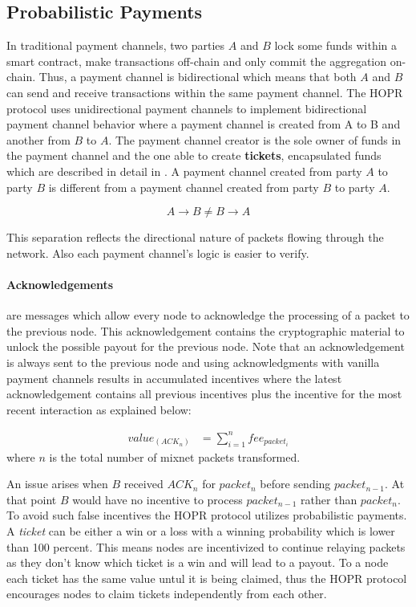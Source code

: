 \subsection{Probabilistic Payments}
\label{sec:probabilisticpayments}

In traditional payment channels, two parties $A$ and $B$ lock some funds within a
smart contract, make transactions off-chain and only commit the aggregation
on-chain. Thus, a payment channel is bidirectional which means that both $A$ and $B$ can
send and receive transactions within the same payment channel. The HOPR protocol uses
unidirectional payment channels to implement bidirectional payment channel behavior where a
payment channel is created from A to B and another from $B$ to $A$. The payment channel creator is
the sole owner of funds in the payment channel and the one able to create
\textbf{tickets}, encapsulated funds which are described in detail in
. A payment channel created from party $A$ to party $B$ is
different from a payment channel created from party $B$ to party $A$.

$$A\rightarrow B \neq B\rightarrow A$$

This separation reflects the directional nature of packets flowing through the
network. Also each payment channel's logic is easier to verify.

\paragraph{Acknowledgements} are messages which allow every node to acknowledge
the processing of a packet to the previous node. This acknowledgement contains
the cryptographic material to unlock the possible payout for the previous node.
Note that an acknowledgement is always sent to the previous node and using
acknowledgments with vanilla payment channels results in accumulated incentives
where the latest acknowledgement contains all previous incentives plus the
incentive for the most recent interaction as explained below:

\begin{align}
value_(ACK_n) &=\sum_{i=1}^nfee_{packet_i}
\end{align}
where $n$ is the total number of mixnet packets transformed.

An issue arises when $B$ received $ACK_n$ for $packet_n$ before sending
$packet_{n-1}$. At that point $B$ would have no incentive to process
$packet_{n-1}$ rather than $packet_{n}$. To avoid such false incentives the HOPR
protocol utilizes probabilistic payments. A \textit{ticket} can be either a win
or a loss with a winning probability which is lower than 100 percent. This means
nodes are incentivized to continue relaying packets as they don’t know which
ticket is a win and will lead to a payout. To a node each ticket has the same
value untul it is being claimed, thus the HOPR protocol encourages nodes to
claim tickets independently from each other.

